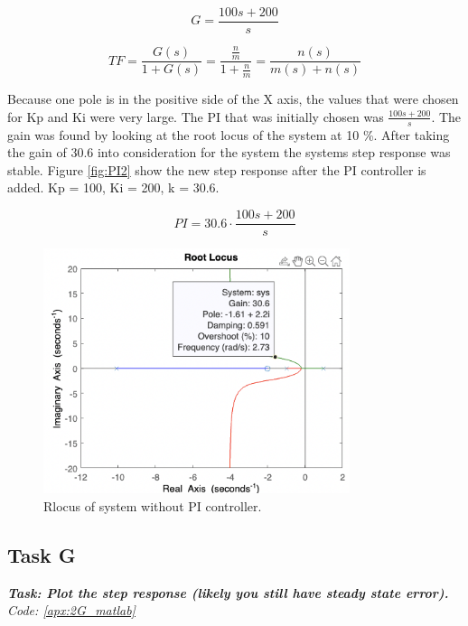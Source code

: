 \begin{equation}
    G = \frac{100s + 200}{s}
    \label{fig:PI2}
\end{equation}

\begin{equation}
    TF = \frac{G(s)}{1+G(s)} = \frac{\frac{n}{m}}{1+\frac{n}{m}} = \frac{n(s)}{m(s)+n(s)}
\end{equation}

Because one pole is in the positive side of the X axis, the values that were chosen for Kp and Ki were very large.
The PI that was initially chosen was $\frac {100s + 200}{s}$. 
\newline
The gain was found by looking at the root locus of the system at 10 \%. After taking the gain of 30.6 into consideration for the system the systems step response was stable. Figure \ref{fig:PI2} show the new step response after the PI controller is added. Kp = 100, Ki = 200, k = 30.6.

\begin{equation}
    PI = 30.6 \cdot \frac{100s + 200}{s}
    \label{fig:PI2}
\end{equation}

\begin{figure}[h!]
    \centering
    \includegraphics[width = 0.8\textwidth]{Images/2F_Rlocus.png}
    \caption{Rlocus of system without PI controller.}
    \label{fig:2F_Rlocus}
\end{figure}

\subsection{Task G}
\textbf{\textit{Task: Plot the step response (likely you still have steady state error).}}
\newline
\textit{Code: \ref{apx:2G_matlab}}

